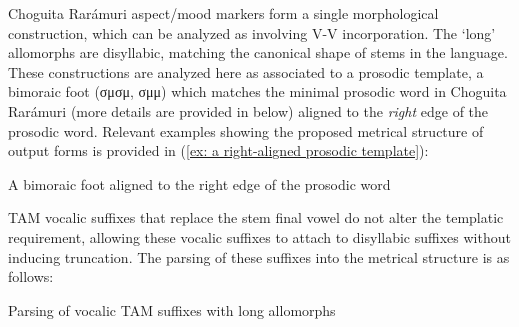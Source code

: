 Choguita Rarámuri aspect/mood markers form a single morphological construction, which can be analyzed as involving V-V incorporation. The `long' allomorphs are disyllabic, matching the canonical shape of stems in the language. These constructions are analyzed here as associated to a prosodic template, a bimoraic foot (σμσμ,  σμμ) which matches the minimal prosodic word in Choguita Rarámuri (more details are provided in  below) aligned to the \textit{right} edge of the prosodic word.  Relevant examples showing the proposed metrical structure of output forms is provided in (\ref{ex: a right-aligned prosodic template}):

\ea\label{ex: a right-aligned prosodic template}
{A bimoraic foot aligned to the right edge of the prosodic word}

    \z
\z

TAM vocalic suffixes that replace the stem final vowel do not alter the templatic requirement, allowing these vocalic suffixes to attach to disyllabic suffixes without inducing truncation. The parsing of these suffixes into the metrical structure is as follows:

\ea\label{ex: Parsing of TAM vocalic suffixes}
{Parsing of vocalic TAM suffixes with long allomorphs}

